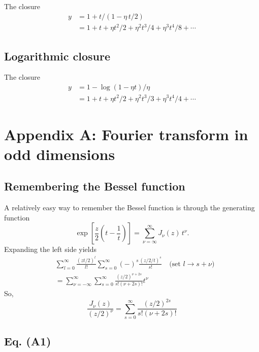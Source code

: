 \documentclass[aip,jcp,reprint,superscriptaddress]{revtex4-1}
\numberwithin{equation}{subsection}
\begin{document}
The closure
\begin{align*}
  y
&=
1 + t/(1 - \eta \, t/2)
\\
&=
1 + t  + \eta t^2/2 + \eta^2 t^3/4 + \eta^3 t^4/8 + \cdots
\end{align*}



\subsection{Logarithmic closure}

The closure
\begin{align*}
  y
&=
1 - \log(1 - \eta t)/\eta
\\
&=
1 + t  + \eta t^2/2 + \eta^2 t^3/3 + \eta^3 t^4/4 + \cdots
\end{align*}



\section{Appendix A: Fourier transform in odd dimensions}

\subsection{Remembering the Bessel function}

A relatively easy way to remember the Bessel function
is through the generating function
\[
  \exp\left[ \frac{z}{2} \left(t - \frac{1}{t}\right) \right]
  =
  \sum_{\nu = \infty}^\infty J_\nu(z) \, t^\nu.
\]
%
Expanding the left side yields
\begin{align*}
&
  \sum_{l = 0}^\infty \frac{ (zt/2)^l } { l! }
  \sum_{s = 0}^\infty (-)^s \frac{ (z/2/t)^s } { s! }
  \quad \mbox{(set $l \rightarrow s + \nu$)} \\
&=
  \sum_{\nu = -\infty}^\infty
  \sum_{s = 0}^\infty
  \frac { (z/2)^{\nu + 2s} } {s! (\nu + 2s)! } t^\nu
\end{align*}
So,
\begin{equation}
  \frac{ J_\nu(z) }{ (z/2)^\nu }
=
  \sum_{s = 0}^\infty
  \frac{ (z/2)^{2s} } { s! (\nu + 2s)! }
  \label{eq:bessel}
\end{equation}



\subsection{Eq. (A1)}
\end{document}
